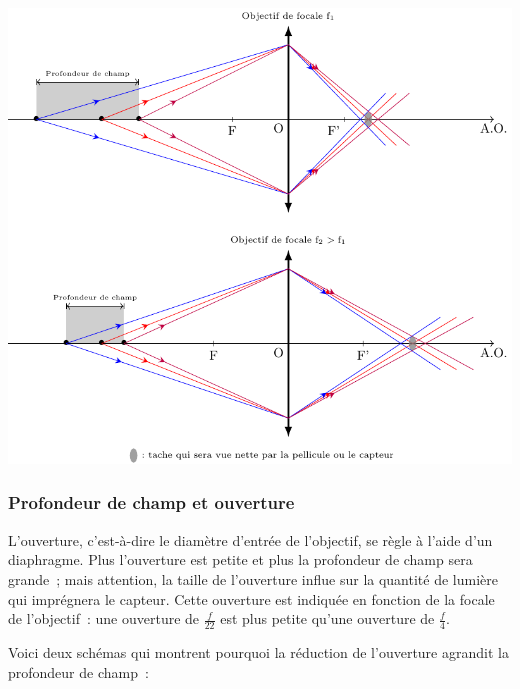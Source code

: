 \documentclass[../../main/main.tex]{subfiles}
\begin{document}
\begin{center}
	\includegraphics[scale=.90]{pfd_chp-foc}
\end{center}

\subsubsection{Profondeur de champ et ouverture}

L'ouverture, c'est-à-dire le diamètre d'entrée de l'objectif, se règle à l'aide
d'un diaphragme. Plus l'ouverture est petite et plus la profondeur de champ sera
grande~; mais attention, la taille de l'ouverture influe sur la quantité de
lumière qui imprégnera le capteur. Cette ouverture est indiquée en fonction de
la focale de l'objectif~: une ouverture de $\frac{f}{22}$ est plus petite qu'une
ouverture de $\frac{f}{4}$.

Voici deux schémas qui montrent pourquoi la réduction de l'ouverture agrandit la
profondeur de champ~:
\end{document}
